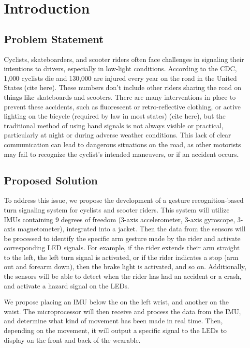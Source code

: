 \section{Introduction}
\subsection{Problem Statement}
Cyclists, skateboarders, and scooter riders often face challenges in signaling their intentions to drivers, especially in low-light conditions. According to the CDC, 1,000 cyclists die and 130,000 are injured every year on the road in the United States (cite here). These numbers don’t include other riders sharing the road on things like skateboards and scooters. There are many interventions in place to prevent these accidents, such as fluorescent or retro-reflective clothing, or active lighting on the bicycle (required by law in most states) (cite here), but the traditional method of using hand signals is not always visible or practical, particularly at night or during adverse weather conditions. This lack of clear communication can lead to dangerous situations on the road, as other motorists may fail to recognize the cyclist's intended maneuvers, or if an accident occurs. 

\subsection{Proposed Solution}
To address this issue, we propose the development of a gesture recognition-based turn signaling system for cyclists and scooter riders. This system will utilize IMUs containing 9 degrees of freedom (3-axis accelerometer, 3-axis gyroscope, 3-axis magnetometer), integrated into a jacket. Then the data from the sensors will be processed to identify the specific arm gesture made by the rider and activate corresponding LED signals. For example, if the rider extends their arm straight to the left, the left turn signal is activated, or if the rider indicates a stop (arm out and forearm down), then the brake light is activated, and so on. Additionally, the sensors will be able to detect when the rider has had an accident or a crash, and activate a hazard signal on the LEDs.

We propose placing an IMU below the on the left wrist, and another on the waist. The microprocessor will then receive and process the data from the IMU, and determine what kind of movement has been made in real time. Then, depending on the movement, it will output a specific signal to the LEDs to display on the front and back of the wearable.


